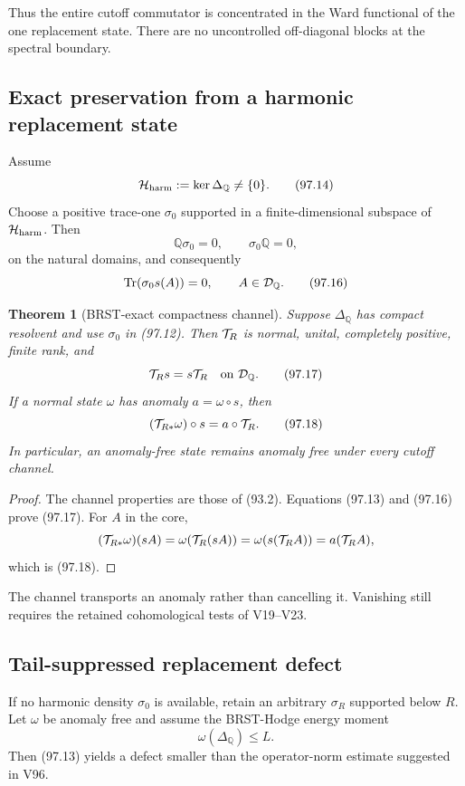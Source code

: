 \documentclass[11pt]{article}
\newtheorem{theorem}{Theorem}[section]
\theoremstyle{remark}
\begin{document}
Thus the entire cutoff commutator is concentrated in the Ward
functional of the one replacement state.  There are no uncontrolled
off-diagonal blocks at the spectral boundary.

\subsection{Exact preservation from a harmonic replacement state}

Assume
\[
 {\cal H}_{\rm harm}:=\ker\Delta_{\mathbb Q}\neq\{0\}.            \tag{97.14}
\]
Choose a positive trace-one \(\sigma_0\) supported in a
finite-dimensional subspace of \({\cal H}_{\rm harm}\).  Then
\[
 {\mathbb Q}\sigma_0=0,\qquad
 \sigma_0{\mathbb Q}=0,                                        \tag{97.15}
\]
on the natural domains, and consequently
\[
 \operatorname{Tr}(\sigma_0s(A))=0,
 \qquad A\in{\cal D}_{\mathbb Q}.                               \tag{97.16}
\]

\begin{theorem}[BRST-exact compactness channel]
\label{thm:v12v97-exact}
Suppose \(\Delta_{\mathbb Q}\) has compact resolvent and use
\(\sigma_0\) in (97.12).  Then \({\cal T}_R\) is normal, unital,
completely positive, finite rank, and
\[
 {\cal T}_R s=s{\cal T}_R
 \quad\text{on }{\cal D}_{\mathbb Q}.                            \tag{97.17}
\]
If a normal state \(\omega\) has anomaly \(a=\omega\circ s\), then
\[
 ({\cal T}_{R*}\omega)\circ s=a\circ{\cal T}_R.                  \tag{97.18}
\]
In particular, an anomaly-free state remains anomaly free under
every cutoff channel.
\end{theorem}

\begin{proof}
The channel properties are those of (93.2).  Equations
(97.13) and (97.16) prove (97.17).  For \(A\) in the core,
\[
 ({\cal T}_{R*}\omega)(sA)
 =\omega({\cal T}_R(sA))
 =\omega(s({\cal T}_RA))
 =a({\cal T}_RA),
\]
which is (97.18).
\end{proof}

The channel transports an anomaly rather than cancelling it.
Vanishing still requires the retained cohomological tests of
V19--V23.

\subsection{Tail-suppressed replacement defect}

If no harmonic density \(\sigma_0\) is available, retain an arbitrary
\(\sigma_R\) supported below \(R\).  Let \(\omega\) be anomaly free
and assume the BRST-Hodge energy moment
\[
 \omega(\Delta_{\mathbb Q})\leq L.                              \tag{97.19}
\]
Then (97.13) yields a defect smaller than the operator-norm estimate
suggested in V96.
\end{document}
